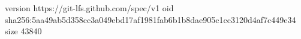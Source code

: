 version https://git-lfs.github.com/spec/v1
oid sha256:5aa49ab5d358cc3a049ebd17af1981fab6b1b8dae905c1cc3120d4af7c449e34
size 43840
